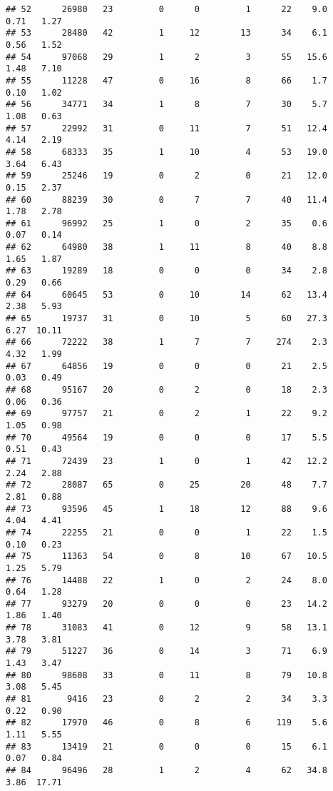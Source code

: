 \documentclass[
]{article}
\begin{document}
\begin{verbatim}
## 52      26980   23         0      0         1      22    9.0    0.71   1.27
## 53      28480   42         1     12        13      34    6.1    0.56   1.52
## 54      97068   29         1      2         3      55   15.6    1.48   7.10
## 55      11228   47         0     16         8      66    1.7    0.10   1.02
## 56      34771   34         1      8         7      30    5.7    1.08   0.63
## 57      22992   31         0     11         7      51   12.4    4.14   2.19
## 58      68333   35         1     10         4      53   19.0    3.64   6.43
## 59      25246   19         0      2         0      21   12.0    0.15   2.37
## 60      88239   30         0      7         7      40   11.4    1.78   2.78
## 61      96992   25         1      0         2      35    0.6    0.07   0.14
## 62      64980   38         1     11         8      40    8.8    1.65   1.87
## 63      19289   18         0      0         0      34    2.8    0.29   0.66
## 64      60645   53         0     10        14      62   13.4    2.38   5.93
## 65      19737   31         0     10         5      60   27.3    6.27  10.11
## 66      72222   38         1      7         7     274    2.3    4.32   1.99
## 67      64856   19         0      0         0      21    2.5    0.03   0.49
## 68      95167   20         0      2         0      18    2.3    0.06   0.36
## 69      97757   21         0      2         1      22    9.2    1.05   0.98
## 70      49564   19         0      0         0      17    5.5    0.51   0.43
## 71      72439   23         1      0         1      42   12.2    2.24   2.88
## 72      28087   65         0     25        20      48    7.7    2.81   0.88
## 73      93596   45         1     18        12      88    9.6    4.04   4.41
## 74      22255   21         0      0         1      22    1.5    0.10   0.23
## 75      11363   54         0      8        10      67   10.5    1.25   5.79
## 76      14488   22         1      0         2      24    8.0    0.64   1.28
## 77      93279   20         0      0         0      23   14.2    1.86   1.40
## 78      31083   41         0     12         9      58   13.1    3.78   3.81
## 79      51227   36         0     14         3      71    6.9    1.43   3.47
## 80      98608   33         0     11         8      79   10.8    3.08   5.45
## 81       9416   23         0      2         2      34    3.3    0.22   0.90
## 82      17970   46         0      8         6     119    5.6    1.11   5.55
## 83      13419   21         0      0         0      15    6.1    0.07   0.84
## 84      96496   28         1      2         4      62   34.8    3.86  17.71

\end{verbatim}
\end{document}
